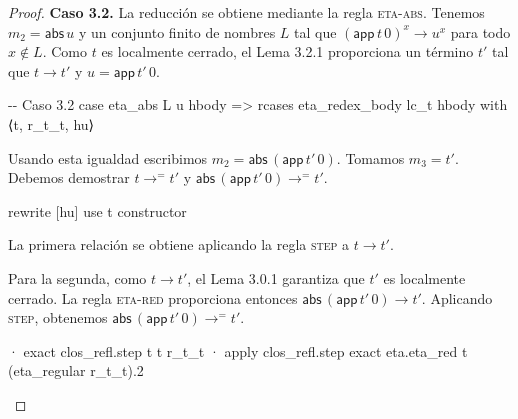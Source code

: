 \documentclass[
  spanish,
  letterpaper,
  DIV=11,
  numbers=noendperiod]{scrreprt}
\newenvironment{Shaded}{\begin{snugshade}}{\end{snugshade}}
\newcommand{\CommentTok}[1]{\textcolor[rgb]{0.37,0.37,0.37}{#1}}
\newcommand{\KeywordTok}[1]{\textcolor[rgb]{0.00,0.23,0.31}{\textbf{#1}}}
\newcommand{\NormalTok}[1]{\textcolor[rgb]{0.00,0.23,0.31}{#1}}
\renewcommand{\NormalTok}[1]{\textcolor[HTML]{000000}{#1}}
\renewcommand{\KeywordTok}[1]{\textcolor[HTML]{0000FF}{#1}}
\renewcommand{\CommentTok}[1]{\textcolor[HTML]{008000}{#1}}
\let\oldgreater\textgreater
\renewcommand{\textgreater}{\null\oldgreater}%
\theoremstyle{remark}
\begin{document}
\begin{proof}
\textbf{Caso 3.2.} La reducción se obtiene mediante la regla
\textsc{eta-abs}. Tenemos \(m_2=\mathsf{abs} \, u\) y un conjunto finito
de nombres \(L\) tal que
\((\mathsf{app} \, t \, 0)^x\longrightarrow u^x\) para todo
\(x\notin L\). Como \(t\) es localmente cerrado, el Lema 3.2.1
proporciona un término \(t'\) tal que \(t\longrightarrow t'\) y
\(u=\mathsf{app} \, t' \,0\).

\begin{Shaded}
\begin{Highlighting}[]
    \CommentTok{{-}{-} Caso 3.2}
\NormalTok{    case eta\_abs L u hbody =\textgreater{}}
\NormalTok{      rcases eta\_redex\_body lc\_t hbody }\KeywordTok{with}\NormalTok{ ⟨t\textquotesingle{}, r\_t\_t\textquotesingle{}, hu⟩}
\end{Highlighting}
\end{Shaded}

Usando esta igualdad escribimos
\(m_2=\mathsf{abs} \, (\mathsf{app} \, t' \,0)\). Tomamos \(m_3=t'\).
Debemos demostrar \(t\longrightarrow^{=}t'\) y
\(\mathsf{abs} \, (\mathsf{app} \, t' \, 0) \longrightarrow^{=}t'\).

\begin{Shaded}
\begin{Highlighting}[]
      \KeywordTok{rewrite}\NormalTok{ [hu]}
\NormalTok{      use t\textquotesingle{}}
\NormalTok{      constructor}
\end{Highlighting}
\end{Shaded}

La primera relación se obtiene aplicando la regla \textsc{step} a
\(t\longrightarrow t'\).

Para la segunda, como \(t\longrightarrow t'\), el Lema 3.0.1 garantiza
que \(t'\) es localmente cerrado. La regla \textsc{eta-red} proporciona
entonces \(\mathsf{abs} \, (\mathsf{app} \, t' \,0)\longrightarrow t'\).
Aplicando \textsc{step}, obtenemos
\(\mathsf{abs} \,(\mathsf{app} \, t' \,0) \longrightarrow^{=}t'\).

\begin{Shaded}
\begin{Highlighting}[]
\NormalTok{      · }\KeywordTok{exact}\NormalTok{ clos\_refl.step t t\textquotesingle{} r\_t\_t\textquotesingle{}}
\NormalTok{      · }\KeywordTok{apply}\NormalTok{ clos\_refl.step}
        \KeywordTok{exact}\NormalTok{ eta.eta\_red t\textquotesingle{} (eta\_regular r\_t\_t\textquotesingle{}).2}
\end{Highlighting}
\end{Shaded}


\end{proof}
\end{document}
